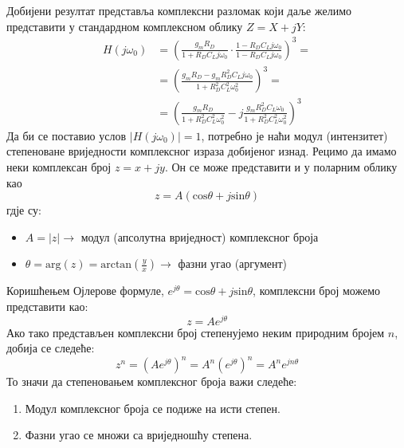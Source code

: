\documentclass[master]{finthesis}
\begin{document}
Добијени резултат представља комплексни разломак који даље желимо представити у стандардном комплексном облику $Z = X + jY$:
\begin{equation} 
	\label{osc_feedback_eq_11}
	\displaystyle
	\begin{split}
		H(j\omega_{0}) &= \left(\frac{g_{m}R_{D}}{1+R_{D}C_{L}j\omega_{0}}\cdot\frac{1-R_{D}C_{L}j\omega_{0}}{1-R_{D}C_{L}j\omega_{0}}\right)^{3} = \\
			       &= \left(\frac{g_{m}R_{D}-g_{m}R_{D}^{2}C_{L}j\omega_{0}}{1+R_{D}^{2}C_{L}^{2}\omega_{0}^{2}}\right)^{3} = \\
			       &= \left(\frac{g_{m}R_{D}}{1+R_{D}^{2}C_{L}^{2}\omega_{0}^2}-j\frac{g_{m}R_{D}^{2}C_{L}\omega_{0}}{1+R_{D}^{2}C_{L}^{2}\omega_{0}^{2}}\right)^{3}
	\end{split}
\end{equation}
Да би се поставио услов $|H(j\omega_{0})|=1$, потребно је наћи модул (интензитет) степеноване вриједности комплексног израза добијеног изнад. Рецимо да имамо неки комплексан број $z=x+jy$. Он се може представити и у поларним облику као
\begin{equation}
	\label{compl_1}
	z = A(\text{cos}\theta + j\text{sin}\theta)
\end{equation}
гдје су:
\begin{itemize}
	\item $A = |z| \rightarrow$ модул (апсолутна вриједност) комплексног броја
	\item $\theta = \text{arg}(z) = \displaystyle \text{arctan}\left(\frac{y}{x}\right) \rightarrow$ фазни угао (аргумент)
\end{itemize}
Коришћењем Ојлерове формуле, $e^{j\theta} = \text{cos}\theta + j\text{sin}\theta$, комплексни број можемо представити као:
\begin{equation}
	\label{compl_2}
	z = Ae^{j\theta}
\end{equation}
Ако тако представљен комплексни број степенујемо неким природним бројем $n$, добија се следеће:
\begin{equation}
	\label{compl_3}
	z^{n} = \left(Ae^{j\theta}\right)^{n} = A^{n}\left(e^{j\theta}\right)^{n} = A^{n}e^{jn\theta}
\end{equation}
То значи да степеновањем комплексног броја важи следеће:
\begin{enumerate}
	\item Модул комплексног броја се подиже на исти степен.
	\item Фазни угао се множи са вриједношћу степена.
\end{enumerate}
\end{document}
